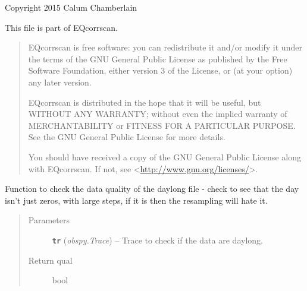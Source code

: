 \documentclass[a4paper,10pt,english]{sphinxmanual}
\begin{document}
Copyright 2015 Calum Chamberlain

This file is part of EQcorrscan.
\begin{quote}

EQcorrscan is free software: you can redistribute it and/or modify
it under the terms of the GNU General Public License as published by
the Free Software Foundation, either version 3 of the License, or
(at your option) any later version.

EQcorrscan is distributed in the hope that it will be useful,
but WITHOUT ANY WARRANTY; without even the implied warranty of
MERCHANTABILITY or FITNESS FOR A PARTICULAR PURPOSE.  See the
GNU General Public License for more details.

You should have received a copy of the GNU General Public License
along with EQcorrscan.  If not, see \textless{}\href{http://www.gnu.org/licenses/}{http://www.gnu.org/licenses/}\textgreater{}.
\end{quote}

\begin{fulllineitems}
\label{utils:pre_processing._check_daylong}
Function to check the data quality of the daylong file - check to see that
the day isn't just zeros, with large steps, if it is then the resampling will
hate it.
\begin{quote}\begin{description}
\item[{Parameters}] \leavevmode
\textbf{\texttt{tr}} (\emph{obspy.Trace}) -- Trace to check if the data are daylong.

\item[{Return qual}] \leavevmode
bool

\end{description}\end{quote}

\end{fulllineitems}

\end{document}
